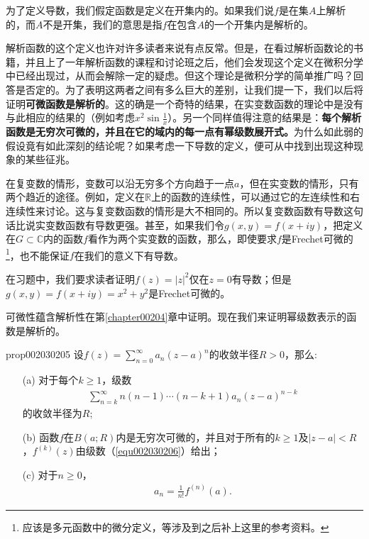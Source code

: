 为了定义导数，我们假定函数是定义在开集内的。如果我们说$f$是在集$A$上解析的，而$A$不是开集，我们的意思是指$f$在包含$A$的一个开集内是解析的。

解析函数的这个定义也许对许多读者来说有点反常。但是，在看过解析函数论的书籍，并且上了一年解析函数的课程和讨论班之后，他们会发现这个定义在微积分学中已经出现过，从而会解除一定的疑虑。但这个理论是微积分学的简单推广吗？回答是否定的。为了表明这两者之间有多么巨大的差别，让我们提一下，我们以后将证明\textbf{可微函数是解析的}。这的确是一个奇特的结果，在实变数函数的理论中是没有与此相应的结果的（例如考虑$x^2\sin{\frac{1}{x}}$）。另一个同样值得注意的结果是：\textbf{每个解析函数是无穷次可微的，并且在它的域内的每一点有幂级数展开式。}为什么如此弱的假设竟有如此深刻的结论呢？如果考虑一下导数的定义，便可从中找到出现这种现象的某些征兆。

在复变数的情形，变数可以沿无穷多个方向趋于一点$a$，但在实变数的情形，只有两个趋近的途径。例如，定义在$\mathbb{R}$上的函数的连续性，可以通过它的左连续性和右连续性来讨论。这与复变数函数的情形是大不相同的。所以复变数函数有导数这句话比说实变数函数有导数更强。甚至，如果我们令$g(x, y) = f(x + iy)$，把定义在$G \subset \mathbb{C}$内的函数$f$看作为两个实变数的函数，那么，即使要求$f$是Frechet可微的\footnote{应该是多元函数中的微分定义，等涉及到之后补上这里的参考资料。}，也不能保证$f$在我们的意义下有导数。

在习题中，我们要求读者证明$f(z)=|z|^2$仅在$z=0$有导数；但是$g(x,y) = f(x+iy) = x^2+y^2$是Frechet可微的。

可微性蕴含解析性在第\ref{chapter00204}章中证明。现在我们来证明幂级数表示的函数是解析的。

\begin{proposition}{}{prop002030205}
设$f(z) = \sum\limits_{n=0}^{\infty}{a_n(z - a)^n}$的收敛半径$R > 0$，那么:
\begin{enumerate}
\item[(a)]对于每个$k \ge 1$，级数
\begin{gather}\label{equ002030206}
\sum_{n=k}^{\infty}{n(n-1)\cdots(n-k+1)a_n(z-a)^{n-k}}
\end{gather}
的收敛半径为$R$;
\item[(b)]函数$f$在$B(a;R)$内是无穷次可微的，并且对于所有的$k \ge 1$及$|z - a| < R$，$f^{(k)}(z)$由级数（\ref{equ002030206}）给出；
\item[(c)]对于$n \ge 0$，
\begin{gather}\label{equ002030207}
a_n = \frac{1}{n!}f^{(n)}(a).
\end{gather}
\end{enumerate}
\end{proposition}

